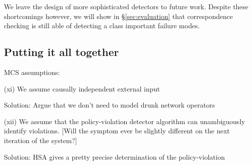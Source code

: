 We leave the design of more sophisticated detectors to future work.
Despite these shortcomings however, we will show in 
\S\ref{sec:evaluation} that correspondence checking is still able of
detecting a class important failure modes.



\subsection{Putting it all together}
                                                                                           
MCS assumptions:

(xi) We assume causally independent external input

Solution: Argue that we don't need to model drunk network operators

(xii) We assume that the policy-violation detector algorithm can unambiguously identify violations. [Will the symptom ever be slightly different on the next iteration of the system?] 

Solution: HSA gives a pretty precise determination of the policy-violation



